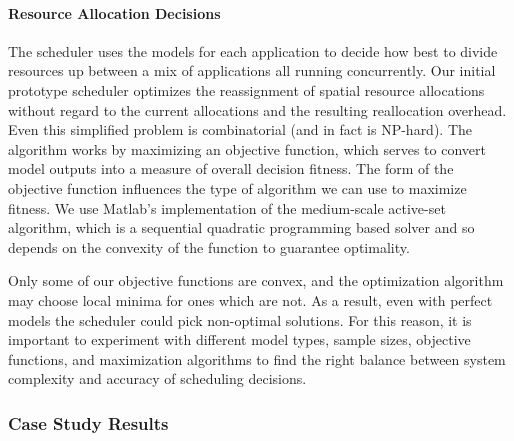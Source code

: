 \paragraph{Resource Allocation Decisions}

The scheduler uses the models for each application to decide how best
to divide resources up between a mix of applications all running
concurrently.  Our initial prototype scheduler optimizes the
reassignment of spatial resource allocations without regard to the
current allocations and the resulting reallocation overhead.  Even
this simplified problem is combinatorial (and in fact is
NP-hard). The algorithm works by maximizing an objective function,
which serves to convert model outputs into a measure of overall
decision fitness.  The form of the objective function influences the
type of algorithm we can use to maximize fitness. We use Matlab's
\cite{matlab} implementation of the medium-scale active-set
algorithm, which is a sequential quadratic programming based solver
and so depends on the convexity of the function to guarantee
optimality.

Only some of our objective functions are convex, and the optimization
algorithm may choose local minima for ones which are not.  As a
result, even with perfect models the scheduler could pick non-optimal
solutions.  For this reason, it is important to experiment with
different model types, sample sizes, objective functions, and
maximization algorithms to find the right balance between system
complexity and accuracy of scheduling decisions.




\subsubsection*{Case Study Results}

